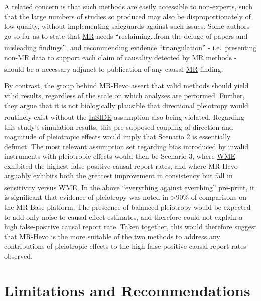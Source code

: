 \documentclass[
]{article}
\begin{document}
A related concern is that such methods are easily accessible to non-experts, such that the large numbers of studies so produced may also be disproportionately of low quality, without implementing safeguards against such issues. Some authors go so far as to state that \hyperref[acronyms_MR]{MR} needs ``reclaiming\ldots from the deluge of papers and misleading findings''\textsuperscript{}, and recommending evidence ``triangulation'' - i.e.~presenting non-\hyperref[acronyms_MR]{MR} data to support each claim of causality detected by \hyperref[acronyms_MR]{MR} methods - should be a necessary adjunct to publication of any causal \hyperref[acronyms_MR]{MR} finding\textsuperscript{}.

By contrast, the group behind MR-Hevo assert that valid methods should yield valid results, regardless of the scale on which analyses are performed. Further, they argue that it is not biologically plausible that directional pleiotropy would routinely exist without the \hyperref[acronyms_InSIDE]{InSIDE} assumption also being violated\textsuperscript{}. Regarding this study's simulation results, this pre-supposed coupling of direction and magnitude of pleiotropic effects would imply that Scenario 2 is essentially defunct. The most relevant assumption set regarding bias introduced by invalid instruments with pleiotropic effects would then be Scenario 3, where \hyperref[acronyms_WME]{WME} exhibited the highest false-positive causal report rates, and where MR-Hevo arguably exhibits both the greatest improvement in consistency but fall in sensitivity versus \hyperref[acronyms_WME]{WME}. In the above ``everything against everthing'' pre-print\textsuperscript{}, it is significant that evidence of pleiotropy was noted in \textgreater90\% of comparisons on the MR-Base platform. The prescence of balanced pleiotropy would be expected to add only noise to causal effect estimates, and therefore could not explain a high false-positive causal report rate. Taken together, this would therefore suggest that MR-Hevo is the more suitable of the two methods to address any contributions of pleiotropic effects to the high false-positive causal report rates observed.

\newpage

\section{Limitations and Recommendations}\label{limitations-and-recommendations}
\end{document}
